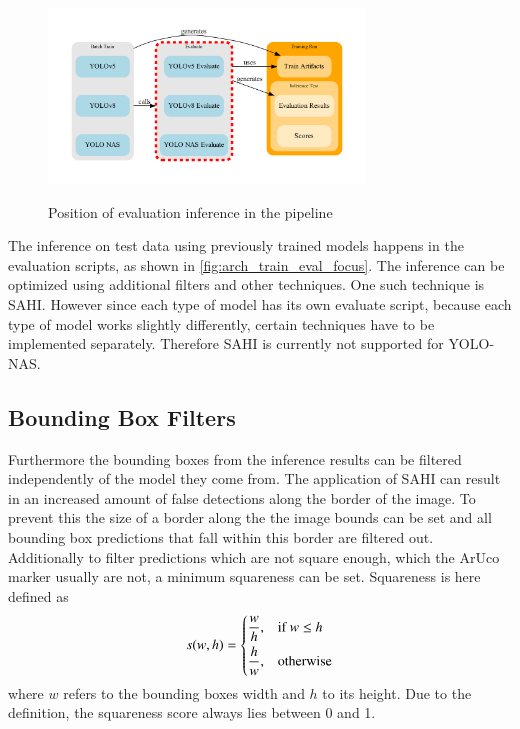 \documentclass[10pt]{book}
\begin{document}
\begin{figure}
  \caption{Position of evaluation inference in the pipeline}
  \includegraphics[width=0.75\textwidth]{graph/arch_train_eval_focus}
  \label{fig:arch_train_eval_focus}
\end{figure}

The inference on test data using previously trained models happens in the evaluation scripts, as shown in \autoref{fig:arch_train_eval_focus}. The inference can be optimized using additional filters and other techniques. One such technique is \ac{SAHI}. However since each type of model has its own evaluate script, because each type of model works slightly differently, certain techniques have to be implemented separately. Therefore \ac{SAHI} is currently not supported for \ac{YOLO}-NAS.

\subsection{Bounding Box Filters}

Furthermore the bounding boxes from the inference results can be filtered independently of the model they come from. The application of \ac{SAHI} can result in an increased amount of false detections along the border of the image. To prevent this the size of a border along the the image bounds can be set and all bounding box predictions that fall within this border are filtered out. Additionally to filter predictions which are not square enough, which the \ac{ArUco} marker usually are not, a minimum squareness can be set. Squareness is here defined as $$ 
s(w,h)=
\begin{dcases}
    \frac{w}{h}, & \text{if } w\leq h\\
    \frac{h}{w}, & \text{otherwise}
\end{dcases} $$ where $w$ refers to the bounding boxes width and $h$ to its height. Due to the definition, the squareness score always lies between 0 and 1.
\end{document}

